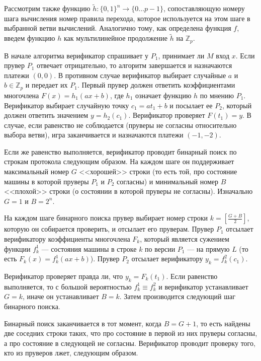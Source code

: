 \documentclass[14pt, a4paper]{extreport}
\begin{document}
        Рассмотрим также функцию $\widetilde{h}: \{0, 1\}^n \longrightarrow \{0\ldots p-1\}$, сопоставляющую номеру шага вычисления номер правила перехода, которое используется на этом шаге в выбранной ветви вычислений. Аналогично тому, как определена функция $f$, введем функцию $h$ как мультилинейное продолжение $\widetilde{h}$ на $\mathbb{Z}_p$.

        В начале алгоритма верификатор спрашивает у $P_1$, принимает ли $M$ вход $x$. Если прувер $P_1$ отвечает отрицательно, то алгоритм завершается и назначаются платежи $(0, 0)$.
        В противном случае верификатор выбирает случайные $a$ и $b \in \mathbb{Z}_p$ и передает их $P_1$. Первый прувер должен ответить коэффициентами многочлена $F(x) = h_1(ax + b)$, где $h_1$ означает функцию $h$ по мнению $P_1$. Верификатор выбирает случайную точку $c_1 = a t_1 + b$ и посылает ее $P_2$, который должен ответить значением $y = h_2(c_1)$. Верификатор проверяет $F(t_1) = y$. В случае, если равенство не соблюдается (пруверы не согласны относительно выбора ветви), игра заканчивается и назначаются платежи $(-1, -2)$.

        Если же равенство выполняется, верификатор проводит бинарный поиск по строкам протокола следующим образом. На каждом шаге он поддерживает максимальный номер $G$ <<хорошей>> строки (то есть той, про состояние машины в которой пруверы $P_1$ и $P_2$ согласны) и минимальный номер $B$ <<плохой>> строки (о состоянии в которой пруверы не согласны). Изначально $G=1$ и $B=2^n$.

        На каждом шаге бинарного поиска прувер выбирает номер строки $k = \left[\frac{G + B}{2}\right]$, которую он собирается проверить, и отсылает его пруверам. Прувер $P_1$ отсылает верификатору коэффициенты многочлена $F_k$, который является сужением функции $f^1_k$ --- состояния машины в строке $k$ по версии $P_1$ --- на прямую $L$ (то есть $F_k(x) = f^1_k(ax + b)$). Прувер $P_2$ отсылает верификатору $y_k = f^2_k(c_1)$.

        Верификатор проверяет правда ли, что $y_k = F_k(t_1)$. Если равенство выполняется, то с большой вероятностью $f^1_k \equiv f^2_k$ и верификатор устанавливает $G = k$, иначе он устанавливает $B = k$. Затем производится следующий шаг бинарного поиска.

        Бинарный поиск заканчивается в тот момент, когда $B = G + 1$, то есть найдены две соседних строки таких, что про состояние в первой из них пруверы согласны, а про состояние в следующей не согласны. Верификатор проводит проверку того, кто из пруверов лжет, следующим образом. 
\end{document}
